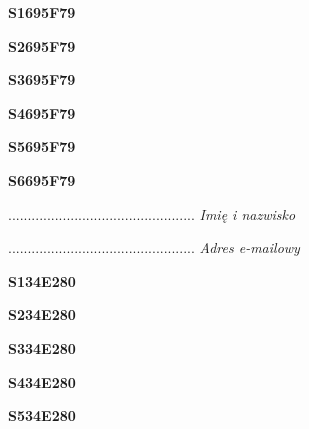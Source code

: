 \begin{turn}{90}\huge \textbf{S1695F79}\end{turn}

\begin{turn}{90}\huge \textbf{S2695F79}\end{turn}

\begin{turn}{90}\huge \textbf{S3695F79}\end{turn}

\begin{turn}{90}\huge \textbf{S4695F79}\end{turn}

\begin{turn}{90}\huge \textbf{S5695F79}\end{turn}

\begin{turn}{90}\huge \textbf{S6695F79}\end{turn}

\begin{turn}{90}\begin{minipage}{\linewidth} \vspace{20mm} ................................................  \textit{Imię i nazwisko}\end{minipage}\end{turn}

\begin{turn}{90}\begin{minipage}{\linewidth} \vspace{20mm} ................................................  \textit{Adres e-mailowy}\end{minipage}\end{turn}

\begin{turn}{90}\huge \textbf{S134E280}\end{turn}

\begin{turn}{90}\huge \textbf{S234E280}\end{turn}

\begin{turn}{90}\huge \textbf{S334E280}\end{turn}

\begin{turn}{90}\huge \textbf{S434E280}\end{turn}

\begin{turn}{90}\huge \textbf{S534E280}\end{turn}

